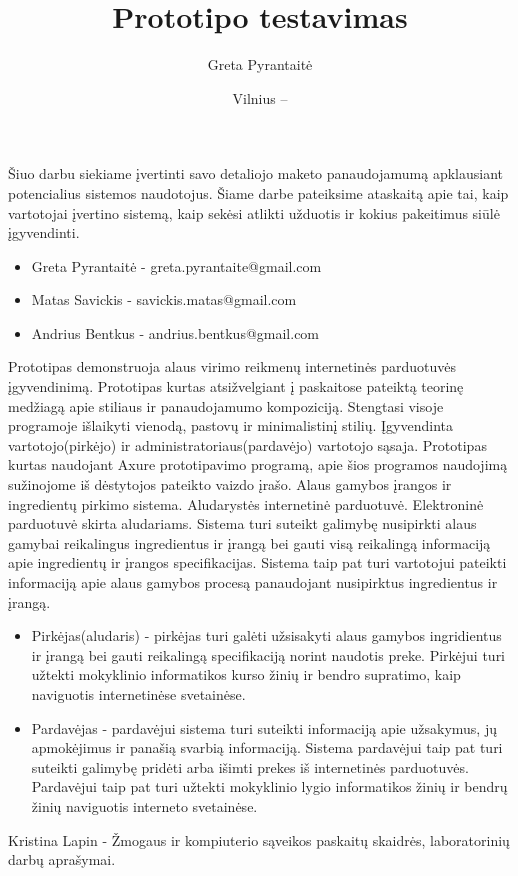 \documentclass[oneside]{VUMIFPSkursinis}
\title{Prototipo testavimas}
\author{Greta Pyrantaitė}
\date{Vilnius – \the\year}
\begin{document}
\maketitle

Šiuo darbu siekiame įvertinti savo detaliojo maketo panaudojamumą apklausiant potencialius sistemos naudotojus. Šiame darbe pateiksime ataskaitą apie tai, kaip vartotojai įvertino sistemą, kaip sekėsi atlikti užduotis ir kokius pakeitimus siūlė įgyvendinti.

\begin{itemize}
	\item{Greta Pyrantaitė - greta.pyrantaite@gmail.com}
	\item{Matas Savickis - savickis.matas@gmail.com}
	\item{Andrius Bentkus - andrius.bentkus@gmail.com}
\end{itemize}

\tableofcontents

		Prototipas demonstruoja alaus virimo reikmenų internetinės parduotuvės įgyvendinimą. Prototipas kurtas atsižvelgiant į paskaitose pateiktą teorinę medžiagą apie stiliaus ir panaudojamumo kompoziciją. Stengtasi visoje programoje išlaikyti vienodą, pastovų ir minimalistinį stilių. Įgyvendinta vartotojo(pirkėjo) ir administratoriaus(pardavėjo) vartotojo sąsaja. Prototipas kurtas naudojant Axure prototipavimo programą, apie šios programos naudojimą sužinojome iš dėstytojos pateikto vaizdo įrašo.
		Alaus gamybos įrangos ir ingredientų pirkimo sistema.
		Aludarystės internetinė parduotuvė.
		Elektroninė parduotuvė skirta aludariams.
		Sistema turi suteikt galimybę nusipirkti alaus gamybai reikalingus ingredientus ir įrangą bei gauti visą reikalingą informaciją apie ingredientų ir įrangos specifikacijas.
		Sistema taip pat turi vartotojui pateikti informaciją apie alaus gamybos procesą panaudojant nusipirktus ingredientus ir įrangą.
		\begin{itemize}
			\item{Pirkėjas(aludaris) - pirkėjas turi galėti užsisakyti alaus gamybos ingridientus ir įrangą bei gauti reikalingą specifikaciją norint naudotis preke.
				Pirkėjui turi užtekti mokyklinio informatikos kurso žinių ir bendro supratimo, kaip naviguotis internetinėse svetainėse.}
			\item{Pardavėjas - pardavėjui sistema turi suteikti informaciją apie užsakymus, jų apmokėjimus ir panašią svarbią informaciją.
				Sistema pardavėjui taip pat turi suteikti galimybę pridėti arba išimti prekes iš internetinės parduotuvės.
				Pardavėjui taip pat turi užtekti mokyklinio lygio informatikos žinių ir bendrų žinių naviguotis interneto svetainėse.}
		\end{itemize}
		Kristina Lapin - Žmogaus ir kompiuterio sąveikos paskaitų skaidrės, laboratorinių darbų aprašymai.
	
\end{document}
